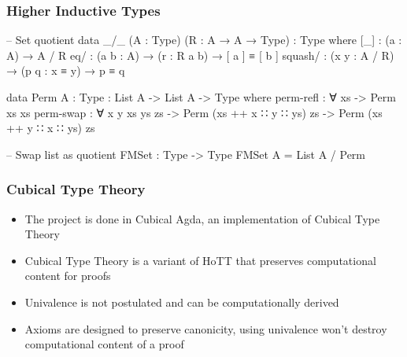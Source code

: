 \documentclass{beamer}
\begin{document}
\begin{frame}[fragile]
\frametitle{Higher Inductive Types}

\begin{code}
-- Set quotient
data _/_ (A : Type) (R : A → A → Type) : Type where
  [_] : (a : A) → A / R
  eq/ : (a b : A) → (r : R a b) → [ a ] ≡ [ b ]
  squash/ : (x y : A / R) → (p q : x ≡ y) → p ≡ q

data Perm {A : Type} : List A -> List A -> Type where
  perm-refl : ∀ {xs} -> Perm xs xs
  perm-swap : ∀ {x y xs ys zs}
    -> Perm (xs ++ x ∷ y ∷ ys) zs
    -> Perm (xs ++ y ∷ x ∷ ys) zs

-- Swap list as quotient
FMSet : Type -> Type
FMSet A = List A / Perm
\end{code}

\end{frame}

\begin{frame}
\frametitle{Cubical Type Theory}

\begin{itemize}

  \item The project is done in Cubical Agda, an implementation of Cubical Type Theory
  \item Cubical Type Theory is a variant of HoTT that preserves computational content for proofs
  \item Univalence is not postulated and can be computationally derived
  \item Axioms are designed to preserve canonicity, using univalence won't destroy computational content of a proof

\end{itemize}


\end{frame}
\end{document}
